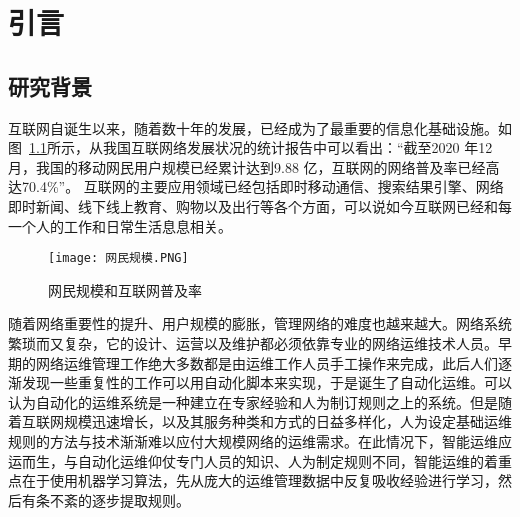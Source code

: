 
\chapter{引言}


\section{研究背景}

互联网自诞生以来，随着数十年的发展，已经成为了最重要的信息化基础设施。如图~\ref{fig:网民规模和互联网普及率}所示，从我国互联网络发展状况的统计报告\cite{cac.gov}中可以看出：“截至2020 年12 月，我国的移动网民用户规模已经累计达到9.88 亿，互联网的网络普及率已经高达70.4\%”。
互联网的主要应用领域已经包括即时移动通信、搜索结果引擎、网络即时新闻、线下线上教育、购物以及出行等各个方面，可以说如今互联网已经和每一个人的工作和日常生活息息相关。



\begin{figure}
    \centering
    \texttt{[image: 网民规模.PNG]}
    \caption{网民规模和互联网普及率}
    \label{fig:网民规模和互联网普及率}
  \end{figure}

随着网络重要性的提升、用户规模的膨胀，管理网络的难度也越来越大。网络系统繁琐而又复杂，它的设计、运营以及维护都必须依靠专业的网络运维技术人员。早期的网络运维管理工作绝大多数都是由运维工作人员手工操作来完成，此后人们逐渐发现一些重复性的工作可以用自动化脚本来实现，于是诞生了自动化运维。可以认为自动化的运维系统是一种建立在专家经验和人为制订规则之上的系统。但是随着互联网规模迅速增长，以及其服务种类和方式的日益多样化，人为设定基础运维规则的方法与技术渐渐难以应付大规模网络的运维需求。在此情况下，智能运维应运而生，与自动化运维仰仗专门人员的知识、人为制定规则不同，智能运维的着重点在于使用机器学习算法，先从庞大的运维管理数据中反复吸收经验进行学习，然后有条不紊的逐步提取规则。


